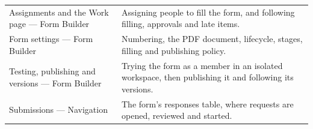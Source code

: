 \begin{table}[H]
\begin{tabularx}{\linewidth}{R{4.2cm} Y}
Assignments and the Work page — Form Builder & Assigning people to fill the form, and following filling, approvals and late items.\\
Form settings — Form Builder & Numbering, the PDF document, lifecycle, stages, filling and publishing policy.\\
Testing, publishing and versions — Form Builder & Trying the form as a member in an isolated workspace, then publishing it and following its versions.\\
Submissions — Navigation & The form's responses table, where requests are opened, reviewed and started.\\
\end{tabularx}
\end{table}
